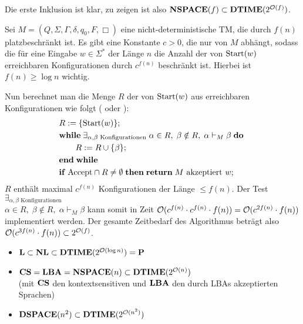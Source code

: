 \begin{Beweis}
    Die erste Inklusion ist klar, zu zeigen ist also $\mathbf{NSPACE}(f) \subset \mathbf{DTIME}(2^{\mathcal{O}(f)})$.
    
    Sei $M = (Q, \Sigma, \Gamma, \delta, q_0, F, \Box)$ eine nicht-deterministische TM,
    die durch $f(n)$ platzbeschränkt ist.
    Es gibt eine Konstante $c > 0$, die nur von $M$ abhängt, sodass
    die für eine Eingabe $w \in \Sigma^\ast$ der Länge $n$ die Anzahl der von $\text{Start}(w)$
    erreichbaren Konfigurationen durch $c^{f(n)}$ beschränkt ist.
    Hierbei ist $f(n) \ge \log n$ wichtig.
    
    Nun berechnet man die Menge $R$ der von $\text{Start}(w)$ aus erreichbaren Konfigurationen wie folgt
    ( oder ):
    \begin{align*}&
        R := \{\text{Start}(w)\};\\&
        \mathbf{while}\; \exists_{\alpha, \beta \text{ Konfigurationen}}\; \alpha \in R,\; \beta \notin R,\;
        \alpha \vdash_M \beta \;\mathbf{do}\;\\&
        \qquad R := R \cup \{\beta\};\\&
        \mathbf{end}\;\mathbf{while}\;\\&
        \mathbf{if}\; \text{Accept} \cap R \not= \emptyset \;\mathbf{then}\; \mathbf{return}\; M \text{ akzeptiert } w;
    \end{align*}
    $R$ enthält maximal $c^{f(n)}$ Konfigurationen der Länge $\le f(n)$.
    Der Test $\exists_{\alpha, \beta \text{ Konfigurationen}}$\\
    $\alpha \in R,\; \beta \notin R,\; \alpha \vdash_M \beta$ kann somit in Zeit
    $\mathcal{O}(c^{f(n)} \cdot c^{f(n)} \cdot f(n)) = \mathcal{O}(c^{2f(n)} \cdot f(n))$
    implementiert werden.
    Der gesamte Zeitbedarf des Algorithmus beträgt also
    $\mathcal{O}(c^{3f(n)} \cdot f(n)) \subset 2^{\mathcal{O}(f)}$.
\end{Beweis}

\linie

\begin{Kor}
    \begin{itemize}
        \item
        $\mathbf{L} \subset \mathbf{NL} \subset \mathbf{DTIME}(2^{\mathcal{O}(\log n)}) = \mathbf{P}$
        
        \item
        $\mathbf{CS} = \mathbf{LBA} = \mathbf{NSPACE}(n) \subset \mathbf{DTIME}(2^{\mathcal{O}(n)})$\\
        (mit $\mathbf{CS}$ den kontextsensitiven und $\mathbf{LBA}$ den durch LBAs akzeptierten Sprachen)
        
        \item
        $\mathbf{DSPACE}(n^2) \subset \mathbf{DTIME}(2^{\mathcal{O}(n^2)})$
    \end{itemize}
\end{Kor}


